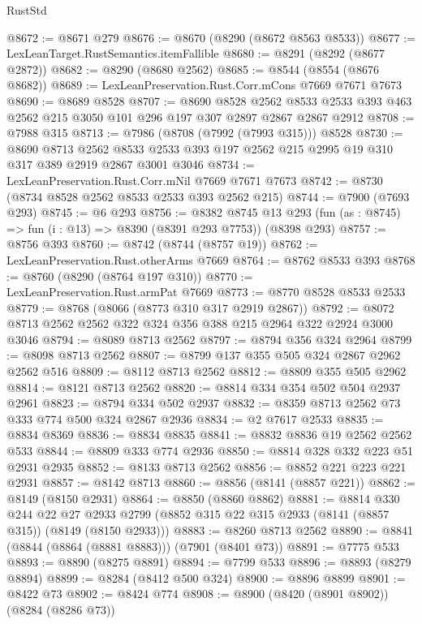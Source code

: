 \begin{lexlean}{RustStd}
\begin{coremodule}
@8672 := @8671 @279
@8676 := @8670 (@8290 (@8672 @8563 @8533))
@8677 := LexLeanTarget.RustSemantics.itemFallible
@8680 := @8291 (@8292 (@8677 @2872))
@8682 := @8290 (@8680 @2562)
@8685 := @8544 (@8554 (@8676 @8682))
@8689 := LexLeanPreservation.Rust.Corr.mCons @7669 @7671 @7673
@8690 := @8689 @8528
@8707 := @8690
    @8528
    @2562
    @8533
    @2533
    @393
    @463
    @2562
    @215
    @3050
    @101
    @296
    @197
    @307
    @2897
    @2867
    @2867
    @2912
@8708 := @7988 @315
@8713 := @7986 (@8708 (@7992 (@7993 @315))) @8528
@8730 := @8690
    @8713
    @2562
    @8533
    @2533
    @393
    @197
    @2562
    @215
    @2995
    @19
    @310
    @317
    @389
    @2919
    @2867
    @3001
    @3046
@8734 := LexLeanPreservation.Rust.Corr.mNil @7669 @7671 @7673
@8742 := @8730 (@8734 @8528 @2562 @8533 @2533 @393 @2562 @215)
@8744 := @7900 (@7693 @293)
@8745 := @6 @293
@8756 := @8382
    @8745
    @13
    @293
    (fun (as : @8745) => fun (i : @13) => @8390 (@8391 @293 @7753))
    (@8398 @293)
@8757 := @8756 @393
@8760 := @8742 (@8744 (@8757 @19))
@8762 := LexLeanPreservation.Rust.otherArms @7669
@8764 := @8762 @8533 @393
@8768 := @8760 (@8290 (@8764 @197 @310))
@8770 := LexLeanPreservation.Rust.armPat @7669
@8773 := @8770 @8528 @8533 @2533
@8779 := @8768 (@8066 (@8773 @310 @317 @2919 @2867))
@8792 := @8072 @8713 @2562 @2562 @322 @324 @356 @388 @215 @2964 @322 @2924 @3000 @3046
@8794 := @8089 @8713 @2562
@8797 := @8794 @356 @324 @2964
@8799 := @8098 @8713 @2562
@8807 := @8799 @137 @355 @505 @324 @2867 @2962 @2562 @516
@8809 := @8112 @8713 @2562
@8812 := @8809 @355 @505 @2962
@8814 := @8121 @8713 @2562
@8820 := @8814 @334 @354 @502 @504 @2937 @2961
@8823 := @8794 @334 @502 @2937
@8832 := @8359 @8713 @2562 @73 @333 @774 @500 @324 @2867 @2936
@8834 := @2 @7617 @2533
@8835 := @8834 @8369
@8836 := @8834 @8835
@8841 := @8832 @8836 @19 @2562 @2562 @533
@8844 := @8809 @333 @774 @2936
@8850 := @8814 @328 @332 @223 @51 @2931 @2935
@8852 := @8133 @8713 @2562
@8856 := @8852 @221 @223 @221 @2931
@8857 := @8142 @8713
@8860 := @8856 (@8141 (@8857 @221))
@8862 := @8149 (@8150 @2931)
@8864 := @8850 (@8860 @8862)
@8881 := @8814
    @330
    @244
    @22
    @27
    @2933
    @2799
    (@8852 @315 @22 @315 @2933 (@8141 (@8857 @315)) (@8149 (@8150 @2933)))
@8883 := @8260 @8713 @2562
@8890 := @8841 (@8844 (@8864 (@8881 @8883))) (@7901 (@8401 @73))
@8891 := @7775 @533
@8893 := @8890 (@8275 @8891)
@8894 := @7799 @533
@8896 := @8893 (@8279 @8894)
@8899 := @8284 (@8412 @500 @324)
@8900 := @8896 @8899
@8901 := @8422 @73
@8902 := @8424 @774
@8908 := @8900 (@8420 (@8901 @8902)) (@8284 (@8286 @73))

\end{coremodule}
\end{lexlean}
